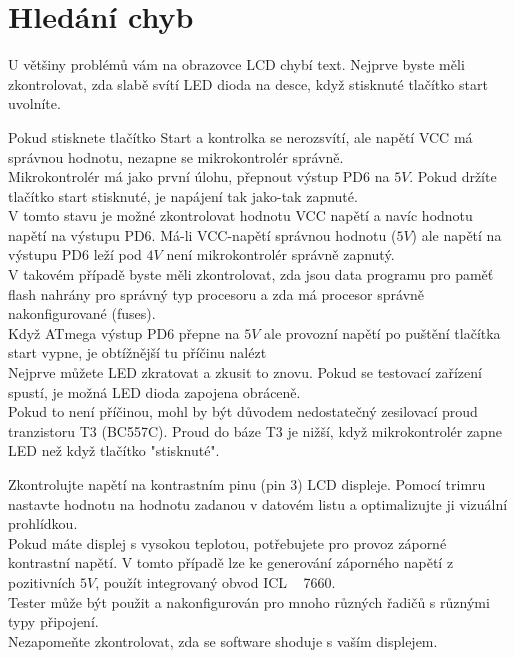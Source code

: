 \section{Hledání chyb}
U většiny problémů vám na obrazovce LCD chybí text.
Nejprve byste měli zkontrolovat, zda slabě svítí LED dioda na desce, když stisknuté tlačítko start
uvolníte.

\begin{description}
\vspace{-0,3 cm}
\item[Zařízení se nezapne]  
Pokud stisknete tlačítko Start a kontrolka se nerozsvítí, ale napětí VCC má správnou hodnotu, nezapne se mikrokontrolér správně.\\
 Mikrokontrolér má jako první úlohu, přepnout výstup PD6 na \(5V\).
Pokud držíte tlačítko start stisknuté, je napájení tak jako-tak zapnuté.\\
V tomto stavu je možné zkontrolovat hodnotu VCC napětí a navíc hodnotu napětí na výstupu PD6.
Má-li VCC-napětí správnou hodnotu (\(5V\)) ale napětí na výstupu PD6 leží pod \(4V\) není mikrokontrolér správně zapnutý.\\
V takovém případě byste měli zkontrolovat, zda jsou data programu pro paměť flash nahrány
pro správný typ procesoru a zda má procesor správně nakonfigurované (fuses).\\
Když ATmega výstup PD6 přepne na \(5V\) ale provozní napětí po puštění tlačítka start vypne,
je obtížnější tu příčinu nalézt\\
Nejprve můžete  LED zkratovat a zkusit to znovu. Pokud se testovací zařízení spustí, je možná
LED dioda zapojena obráceně.\\
Pokud to není příčinou, mohl by být důvodem nedostatečný zesilovací proud tranzistoru T3 (BC557C).
Proud do báze T3 je nižší, když mikrokontrolér zapne LED než když tlačítko "stisknuté".
\vspace{-0,3 cm}
\item[Na LCD displeji nelze číst] 
Zkontrolujte napětí na kontrastním pinu (pin 3) LCD displeje.
Pomocí trimru nastavte hodnotu na hodnotu zadanou v datovém listu a optimalizujte ji
vizuální prohlídkou.\\
Pokud máte displej s vysokou teplotou, potřebujete pro provoz záporné kontrastní napětí.
V tomto případě lze ke generování záporného napětí z pozitivních \(5V\), použít integrovaný obvod ICL ~ 7660.\\
Tester může být použit a nakonfigurován pro mnoho různých řadičů s různými typy připojení.\\ Nezapomeňte zkontrolovat, zda se software shoduje s vaším displejem.\\

\end{description}
